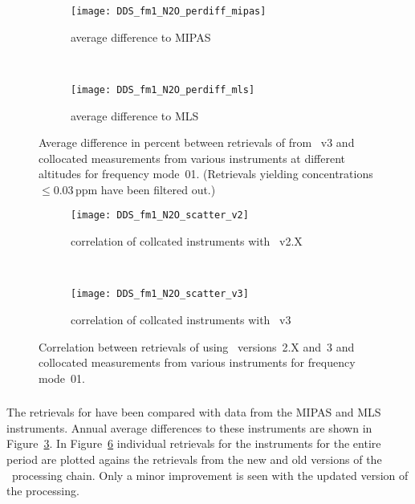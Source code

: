 \begin{figure}[htpb]
    \centering
    \begin{subfigure}[b]{0.49\textwidth}
        \texttt{[image: DDS\_fm1\_N2O\_perdiff\_mipas]}
        \caption{average difference to MIPAS}
        \label{fig:fm01:N2O:profiles:MIPAS}
    \end{subfigure}
    \,
    \begin{subfigure}[b]{0.49\textwidth}
        \texttt{[image: DDS\_fm1\_N2O\_perdiff\_mls]}
        \caption{average difference to MLS}
        \label{fig:fm01:N2O:profiles:MLS}
    \end{subfigure}
    \caption{Average difference in percent between retrievals of 
    from \smr~v3 and collocated measurements from various instruments at
    different altitudes for frequency mode~01. (Retrievals yielding
    concentrations $\leq 0.03\,\mathrm{ppm}$ have been filtered out.)}
    \label{fig:fm01:N2O:profiles}
\end{figure}

\begin{figure}[htpb]
    \centering
    \begin{subfigure}[b]{0.49\textwidth}
        \texttt{[image: DDS\_fm1\_N2O\_scatter\_v2]}
        \caption{correlation of collcated instruments with \smr~v2.X}
        \label{fig:fm01:N2O:scatter:v2}
    \end{subfigure}
    \,
    \begin{subfigure}[b]{0.49\textwidth}
        \texttt{[image: DDS\_fm1\_N2O\_scatter\_v3]}
        \caption{correlation of collcated instruments with \smr~v3}
        \label{fig:fm01:N2O:scatter:v3}
    \end{subfigure}
    \caption{Correlation between retrievals of  using \smr\
    versions~2.X and~3 and collocated measurements from various instruments
    for frequency mode~01.}
    \label{fig:fm01:N2O:scatter}
\end{figure}

\subsubsection{}
\label{sec:fm01:comparison:N2O}
The retrievals for \chem{N_2O} have been compared with data from the MIPAS and
MLS instruments. Annual average differences to these instruments are shown in
Figure~\ref{fig:fm01:N2O:profiles}. In Figure~\ref{fig:fm01:N2O:scatter}
individual retrievals for the instruments for the entire period are plotted
agains the retrievals from the new and old versions of the \smr\ processing
chain. Only a minor improvement is seen with the updated version of the
processing.


